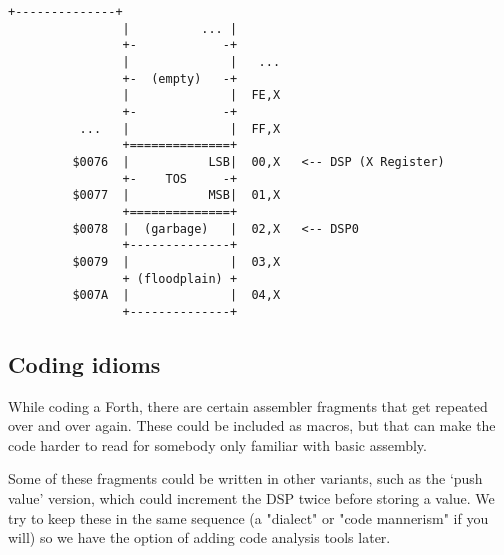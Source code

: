 \begin{lstlisting}[frame=single]
                +--------------+
                |          ... |
                +-            -+
                |              |   ...
                +-  (empty)   -+
                |              |  FE,X
                +-            -+
          ...   |              |  FF,X
                +==============+
         $0076  |           LSB|  00,X   <-- DSP (X Register)
                +-    TOS     -+
         $0077  |           MSB|  01,X
                +==============+
         $0078  |  (garbage)   |  02,X   <-- DSP0
                +--------------+
         $0079  |              |  03,X
                + (floodplain) +
         $007A  |              |  04,X
                +--------------+
\end{lstlisting}

\subsection{Coding idioms}
While coding a Forth, there are certain assembler fragments that get repeated
over and over again. These could be included as macros, but that can make the
code harder to read for somebody only familiar with basic assembly.

Some of these fragments could be written in other variants, such as the `push
value' version, which could increment the DSP twice before storing a value. We
try to keep these in the same sequence (a "dialect" or "code mannerism" if you
will) so we have the option of adding code analysis tools later.

